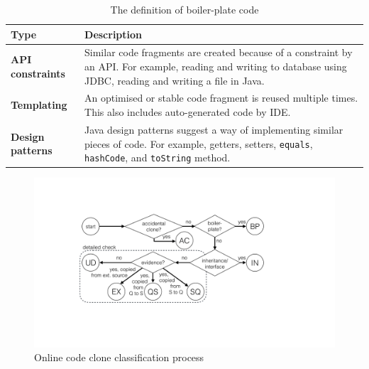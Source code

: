 \documentclass[10pt,journal,compsoc]{IEEEtran}
\begin{document}
\begin{table}
	\centering
	\caption{The definition of boiler-plate code}
	\label{tab:boiler-plate_code}
	\begin{tabular}{lp{5.5cm}}
		\toprule
		Type & Description \\ 
		\midrule
		\textbf{API constraints} & Similar code fragments are created because of a constraint by an API. For example, reading and writing to database using JDBC, reading and writing a file in Java. \\
		\midrule
		\textbf{Templating} & An optimised or stable code fragment is reused multiple times. This also includes auto-generated code by IDE. \\
		\midrule
		\textbf{Design patterns} & Java design patterns suggest a way of implementing similar pieces of code. For example, getters, setters, {\small\texttt{equals}}, {\small\texttt{hashCode}}, and {\small\texttt{toString}} method. \\
		\bottomrule 
	\end{tabular}  %
\end{table}

\begin{figure}
	\centering
	\includegraphics[width=0.9\linewidth]{classification_process}\vspace{-1ex}
	\caption{Online code clone classification process}
	\label{fig:classification_process}
\end{figure}
\end{document}
